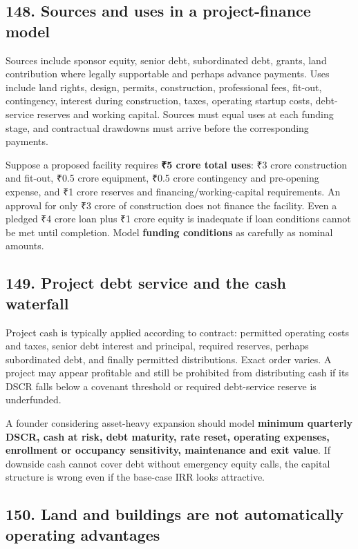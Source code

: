 \subsection{148. Sources and uses in a project-finance model}


Sources include sponsor equity, senior debt, subordinated debt, grants, land contribution where legally supportable and perhaps advance payments. Uses include land rights, design, permits, construction, professional fees, fit-out, contingency, interest during construction, taxes, operating startup costs, debt-service reserves and working capital. Sources must equal uses at each funding stage, and contractual drawdowns must arrive before the corresponding payments.

Suppose a proposed facility requires \textbf{₹5 crore total uses}: ₹3 crore construction and fit-out, ₹0.5 crore equipment, ₹0.5 crore contingency and pre-opening expense, and ₹1 crore reserves and financing/working-capital requirements. An approval for only ₹3 crore of construction does not finance the facility. Even a pledged ₹4 crore loan plus ₹1 crore equity is inadequate if loan conditions cannot be met until completion. Model \textbf{funding conditions} as carefully as nominal amounts.

\subsection{149. Project debt service and the cash waterfall}


Project cash is typically applied according to contract: permitted operating costs and taxes, senior debt interest and principal, required reserves, perhaps subordinated debt, and finally permitted distributions. Exact order varies. A project may appear profitable and still be prohibited from distributing cash if its DSCR falls below a covenant threshold or required debt-service reserve is underfunded.

A founder considering asset-heavy expansion should model \textbf{minimum quarterly DSCR, cash at risk, debt maturity, rate reset, operating expenses, enrollment or occupancy sensitivity, maintenance and exit value}. If downside cash cannot cover debt without emergency equity calls, the capital structure is wrong even if the base-case IRR looks attractive.

\subsection{150. Land and buildings are not automatically operating advantages}


